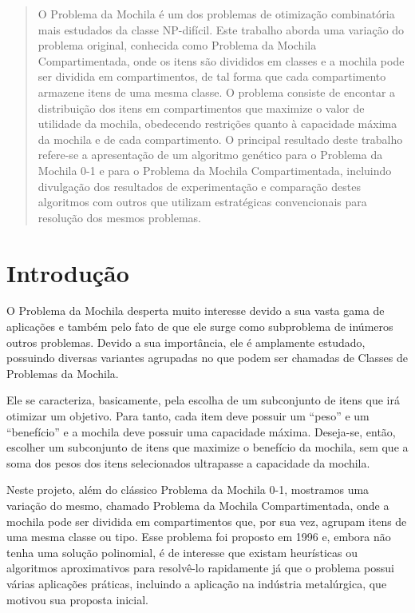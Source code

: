 \pagestyle{plain}

\begin{abstract}
O Problema da Mochila é um dos problemas de otimização combinatória mais estudados da classe NP-difícil. Este trabalho aborda uma variação do problema original, conhecida como Problema da Mochila Compartimentada, onde os itens são divididos em classes e a mochila pode ser dividida em compartimentos, de tal forma que cada compartimento armazene itens de uma mesma classe. O problema consiste de encontar a distribuição dos itens em compartimentos que maximize o valor de utilidade da mochila, obedecendo restrições quanto à capacidade máxima da mochila e de cada compartimento. O  principal resultado deste trabalho refere-se a apresentação de um algoritmo genético para o Problema da Mochila 0-1 e para o Problema da Mochila Compartimentada, incluindo divulgação dos resultados de experimentação e comparação destes algoritmos com outros que utilizam estratégicas convencionais para resolução dos mesmos problemas.

\end{abstract}

\chapter*{Introdução} \label{sec:introducao}
O Problema da Mochila desperta muito interesse devido a sua vasta gama de aplicações e também pelo fato de que ele surge como subproblema de inúmeros outros problemas. Devido a sua importância, ele é amplamente estudado, possuindo diversas variantes agrupadas no que podem ser chamadas de Classes de Problemas da Mochila.

Ele se caracteriza, basicamente, pela escolha de um subconjunto de itens que irá otimizar um objetivo. Para tanto, cada item deve possuir um ``peso'' e um ``benefício'' e a mochila deve possuir uma capacidade máxima.  Deseja-se, então, escolher um subconjunto de itens que maximize o benefício da mochila, sem que a soma dos pesos dos itens selecionados ultrapasse a capacidade da mochila.

Neste projeto, além do clássico Problema da Mochila 0-1, mostramos uma variação do mesmo, chamado Problema da Mochila Compartimentada, onde a mochila pode ser dividida em compartimentos que, por sua vez, agrupam itens de uma mesma classe ou tipo. Esse problema foi proposto em 1996 e, embora não tenha uma solução polinomial, é de interesse que existam heurísticas ou algoritmos aproximativos para resolvê-lo rapidamente já que o problema possui várias aplicações práticas, incluindo a aplicação na indústria metalúrgica, que motivou sua proposta inicial.


